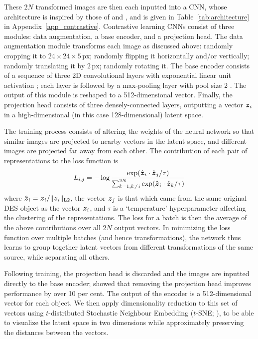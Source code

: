 \documentclass[fleqn,usenatbib]{mnras}
\begin{document}
These $2N$ transformed images are then each inputted into a CNN, whose architecture is inspired by those of \citet{sarmiento21} and \citet{chen20}, and is given in Table~\ref{tab:architecture} in Appendix~\ref{app_contrastive}.
Contrastive learning CNNs consist of three modules: data augmentation, a base encoder, and a projection head.
The data augmentation module transforms each image as discussed above:
randomly cropping it to $24\times24\times5\,\text{px}$;
randomly flipping it horizontally and/or vertically;
randomly translating it by $2\,\text{px}$;
randomly rotating it.
The base encoder consists of a sequence of three 2D convolutional layers \citep{fukushima79} with exponential linear unit activation \citep{elu}; each layer is followed by a max-pooling layer with pool size 2 \citep{weng92}.
The output of this module is reshaped to a 512-dimensional vector.
Finally, the projection head consists of three densely-connected layers, outputting a vector $\vb*{z}_i$ in a high-dimensional (in this case 128-dimensional) latent space.

The training process consists of altering the weights of the neural network so that similar images are projected to nearby vectors in the latent space, and different images are projected far away from each other.
The contribution of each pair of representations to the loss function is
\begin{equation}
L_{i;j} = -\log \frac{
    \exp(
        \hat{\vb*{z}}_i \cdot \hat{\vb*{z}}_j
        / \tau
    )
}{
    \sum_{k=1, k\neq i}^{2N}
        \exp(
            \hat{\vb*{z}}_i \cdot \hat{\vb*{z}}_k
            / \tau
        )
}
\label{eq:loss}
\end{equation}
where $\hat{\vb*{z}}_i = \vb*{z}_i / \lVert\vb*{z}_i\rVert_\text{L2}$, the vector $\vb*{z}_j$ is that which came from the same original DES object as the vector $\vb*{z}_i$, and $\tau$ is a `temperature' hyperparameter affecting the clustering of the representations.
The loss for a batch is then the average of the above contributions over all $2N$ output vectors.
In minimizing the loss function over multiple batches (and hence transformations), the network thus learns to group together latent vectors from different transformations of the same source, while separating all others.

Following training, the projection head is discarded and the images are inputted directly to the base encoder;
\citet{chen20} showed that removing the projection head improves performance by over 10 per cent.
The output of the encoder is a 512-dimensional vector for each object.
We then apply dimensionality reduction to this set of vectors using $t$-distributed Stochastic Neighbour Embedding ($t$-SNE; \citealt{tSNE}), to be able to visualize the latent space in two dimensions while approximately preserving the distances between the vectors.
\end{document}
